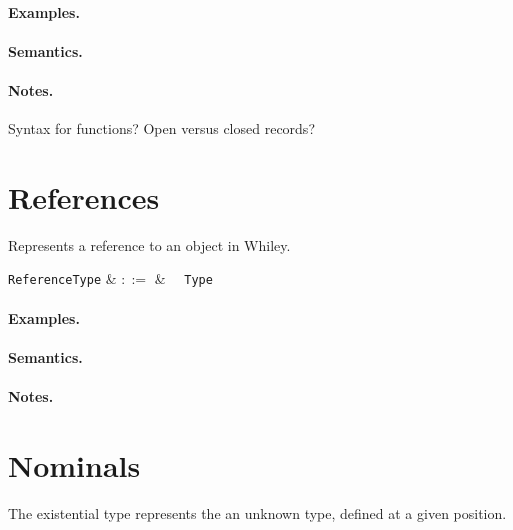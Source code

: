 \paragraph{Examples.}

\paragraph{Semantics.}

\paragraph{Notes.}  Syntax for functions?  Open versus closed records?


\section{References}

Represents a reference to an object in Whiley.

\begin{syntax}
  \verb+ReferenceType+ & $::=$ & \token{\&}\ \ \verb+Type+\\
\end{syntax}

\paragraph{Examples.}

\paragraph{Semantics.}

\paragraph{Notes.}


\section{Nominals}

The existential type represents the an unknown type, defined at a given position.

